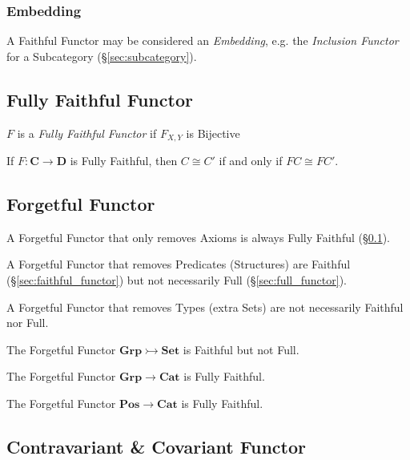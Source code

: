 \subsubsection{Embedding}\label{sec:category_embedding}

A Faithful Functor may be considered an \emph{Embedding}, e.g. the
\emph{Inclusion Functor} for a Subcategory
(\S\ref{sec:subcategory}).



\subsection{Fully Faithful Functor}\label{sec:fully_faithful}

$F$ is a \emph{Fully Faithful Functor} if $F_{X,Y}$ is Bijective

If $F : \mathbf{C} \rightarrow \mathbf{D}$ is Fully Faithful, then $C
\cong C'$ if and only if $FC \cong FC'$.



\subsection{Forgetful Functor}\label{sec:forgetful_functor}

A Forgetful Functor that only removes Axioms is always Fully Faithful
(\S\ref{sec:fully_faithful}).

A Forgetful Functor that removes Predicates (Structures) are Faithful
(\S\ref{sec:faithful_functor}) but not necessarily Full
(\S\ref{sec:full_functor}).

A Forgetful Functor that removes Types (extra Sets) are not
necessarily Faithful nor Full.

The Forgetful Functor $\mathbf{Grp} \rightarrowtail \mathbf{Set}$ is
Faithful but not Full.

The Forgetful Functor $\mathbf{Grp} \rightarrow \mathbf{Cat}$ is
Fully Faithful.

The Forgetful Functor $\mathbf{Pos} \rightarrow \mathbf{Cat}$ is
Fully Faithful.



\subsection{Contravariant \& Covariant Functor}
\label{sec:contravariant_functor}

